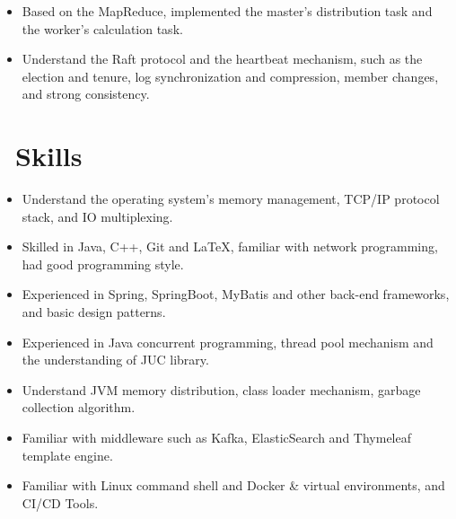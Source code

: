 \documentclass{resume}
\begin{document}
\begin{itemize}
  \item Based on the MapReduce, implemented the master's distribution task and the worker's calculation task.
  \item Understand the Raft protocol and the heartbeat mechanism, such as the election and tenure, log synchronization and compression, member changes, and strong consistency.
\end{itemize}
\vspace{-1.5ex}



\section{\faCogs\ Skills}
\begin{itemize}[parsep=0.5ex]
  \item Understand the operating system's memory management, TCP/IP protocol stack, and IO multiplexing.
  \item Skilled in Java, C++, Git and \LaTeX, familiar with network programming, had good programming style.
  \item Experienced in Spring, SpringBoot, MyBatis and other back-end frameworks, and basic design patterns.
  \item Experienced in Java concurrent programming, thread pool mechanism and the understanding of JUC library.
  \item Understand JVM memory distribution, class loader mechanism, garbage collection algorithm.
  \item Familiar with middleware such as Kafka, ElasticSearch and Thymeleaf template engine.
  \item Familiar with Linux command shell and Docker \& virtual environments, and CI/CD Tools.
\end{itemize}
\vspace{-1.5ex}
\end{document}
